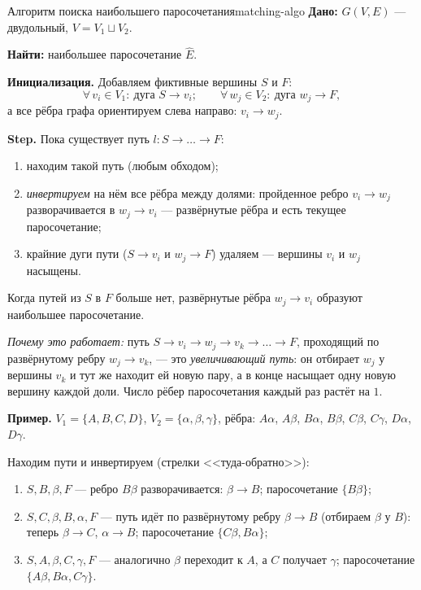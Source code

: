 \begin{algo}{Алгоритм поиска наибольшего паросочетания}{matching-algo}
\textbf{Дано:} $G(V, E)$ --- двудольный, $V = V_1 \sqcup V_2$.

\textbf{Найти:} наибольшее паросочетание $\hat{E}$.

\medskip
\textbf{Инициализация.} Добавляем фиктивные вершины $S$ и $F$:
\[
  \forall\, v_i \in V_1\colon\ \text{дуга } S \to v_i;
  \qquad
  \forall\, w_j \in V_2\colon\ \text{дуга } w_j \to F,
\]
а все рёбра графа ориентируем слева направо: $v_i \to w_j$.

\medskip
\textbf{Step.} Пока существует путь $l\colon S \to \ldots \to F$:
\begin{enumerate}
  \item находим такой путь (любым обходом);
  \item \emph{инвертируем} на нём все рёбра между долями:
        пройденное ребро $v_i \to w_j$ разворачивается в $w_j \to v_i$
        --- развёрнутые рёбра и есть текущее паросочетание;
  \item крайние дуги пути ($S \to v_i$ и $w_j \to F$) удаляем ---
        вершины $v_i$ и $w_j$ насыщены.
\end{enumerate}
Когда путей из $S$ в $F$ больше нет, развёрнутые рёбра $w_j \to v_i$
образуют наибольшее паросочетание.

\medskip
\textit{Почему это работает:} путь $S \to v_i \to w_j \to v_k \to \ldots
\to F$, проходящий по развёрнутому ребру $w_j \to v_k$, --- это
\emph{увеличивающий путь}: он отбирает $w_j$ у вершины $v_k$ и тут же
находит ей новую пару, а в конце насыщает одну новую вершину каждой
доли. Число рёбер паросочетания каждый раз растёт на $1$.

\medskip
\noindent\textbf{Пример.} $V_1 = \{A, B, C, D\}$,
$V_2 = \{\alpha, \beta, \gamma\}$, рёбра:
$A\alpha$, $A\beta$, $B\alpha$, $B\beta$, $C\beta$, $C\gamma$,
$D\alpha$, $D\gamma$.


Находим пути и инвертируем (стрелки <<туда-обратно>>):
\begin{enumerate}
  \item $S, B, \beta, F$ --- ребро $B\beta$ разворачивается:
        $\beta \to B$; паросочетание $\{B\beta\}$;
  \item $S, C, \beta, B, \alpha, F$ --- путь идёт по развёрнутому ребру
        $\beta \to B$ (отбираем $\beta$ у $B$): теперь $\beta \to C$,
        $\alpha \to B$; паросочетание $\{C\beta, B\alpha\}$;
  \item $S, A, \beta, C, \gamma, F$ --- аналогично $\beta$ переходит к
        $A$, а $C$ получает $\gamma$;
        паросочетание $\{A\beta, B\alpha, C\gamma\}$.
\end{enumerate}


\end{algo}
